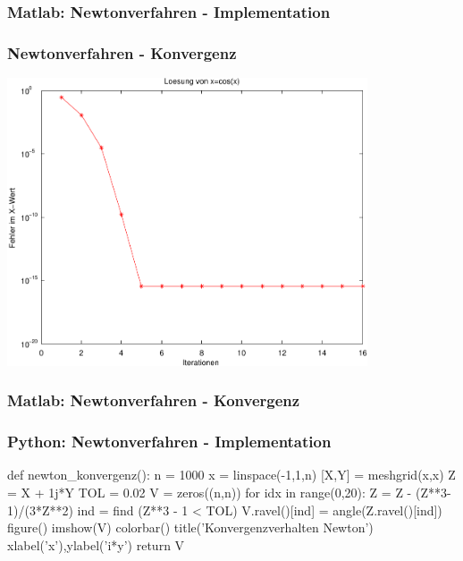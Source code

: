 \documentclass[hyperref={xetex}]{beamer}
\begin{document}
\begin{frame}[fragile]\frametitle{Matlab: Newtonverfahren - Implementation}
\end{frame}


\begin{frame}[fragile]\frametitle{Newtonverfahren - Konvergenz}
\begin{center}
 \includegraphics[width=0.8\textwidth]{figures/newton.pdf}
\end{center}
\end{frame}


\begin{frame}[fragile]\frametitle{Matlab: Newtonverfahren - Konvergenz}
\end{frame}

\begin{frame}[fragile]\frametitle{Python: Newtonverfahren - Implementation}
  \begin{pyin}
def newton_konvergenz():
    n = 1000
    x = linspace(-1,1,n)
    [X,Y] = meshgrid(x,x)
    Z = X + 1j*Y
    TOL = 0.02
    V = zeros((n,n))
    for idx in range(0,20):
        Z = Z - (Z**3-1)/(3*Z**2)
        ind = find (Z**3 - 1 < TOL)
        V.ravel()[ind] = angle(Z.ravel()[ind])
    figure()
    imshow(V)
    colorbar()
    title('Konvergenzverhalten Newton')
    xlabel('x'),ylabel('i*y')
    return V    
  \end{pyin}
\end{frame}
\end{document}
